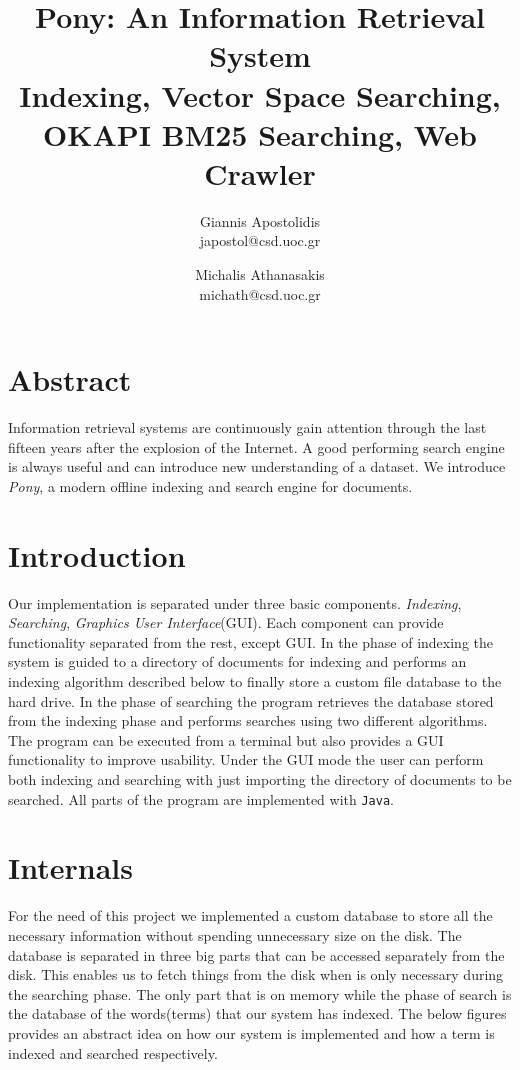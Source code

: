 \documentclass[letterpaper,10pt]{article}
\begin{document}
\date{}

\title{\Large Pony: An Information Retrieval System \\ \small Indexing, Vector Space Searching, OKAPI BM25 Searching, Web Crawler}


\author{{\rm Giannis Apostolidis}\\
				{\rm japostol@csd.uoc.gr}\\
				\and
				{\rm Michalis Athanasakis}\\
				{\rm michath@csd.uoc.gr}\\
}
\maketitle
\section{Abstract}
Information retrieval systems are continuously gain attention through the last fifteen years after the explosion of the Internet. A good performing search engine is always useful and can introduce new understanding of a dataset. We introduce \emph{ Pony}, a modern offline indexing and search engine for documents.

\section{Introduction}
Our implementation is separated under three basic components.\emph{ Indexing}, \emph{ Searching}, \emph{ Graphics User Interface}(GUI). Each component can provide functionality separated from the rest, except GUI. In the phase of indexing the system is guided to a directory of documents for indexing and performs an indexing algorithm described below to finally store a custom file database to the hard drive. In the phase of searching the program retrieves the database stored from the indexing phase and performs searches using two different algorithms. The program can be executed from a terminal but also provides a GUI functionality to improve usability. Under the GUI mode the user can perform both indexing and searching with just importing the directory of documents to be searched. All parts of the program are implemented with {\tt Java}.

\section{Internals}
For the need of this project we implemented a custom database to store all the necessary information without spending unnecessary size on the disk. The database is separated in three big parts that can be accessed separately from the disk. This enables us to fetch things from the disk when is only necessary during the searching phase. The only part that is on memory while the phase of search is the database of the words(terms) that our system has indexed. The below figures provides an abstract idea on how our system is implemented and how a term is indexed and searched respectively.
\end{document}
